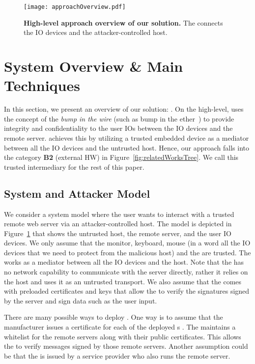 \begin{figure}[t]
\centering
\texttt{[image: approachOverview.pdf]}
\caption{\textbf{High-level approach overview of our solution.}  The \device connects the  IO devices and the attacker-controlled host. 
}
\spacesave
\label{fig:approachOverview}
\centering
\end{figure}

\section{System Overview \& Main Techniques}
\label{sec:approach}

In this section, we present an overview of our solution: \name. On the high-level, \name uses the concept of the \emph{bump in the wire} (such as bump in the ether~\cite{McCPerRei2006}) to provide integrity and confidentiality to the user IO{}s between the IO devices and the remote server. \name achieves this by utilizing a trusted embedded device as a mediator between all the IO devices and the untrusted host. Hence, our approach falls into the category \textbf{B2} (external HW) in Figure~\ref{fig:relatedWorksTree}. 
We call this trusted intermediary \device for the rest of this paper.   


\subsection{System and Attacker Model}
\label{sec:approach:systemAttackerModel}

We consider a system model where the user wants to interact with a trusted remote web server via an attacker-controlled host. The model is depicted in Figure~\ref{fig:approachOverview} that shows the untrusted host, the remote server, and the user IO devices. We only assume that the monitor, keyboard, mouse (in a word all the IO devices that we need to protect from the malicious host) and the \device are trusted. The \device works as a mediator between all the IO devices and the host. Note that the \device has no network capability to communicate with the server directly, rather it relies on the host and uses it as an untrusted transport. We also assume that the \device comes with preloaded certificates and keys that allow the \device to verify the signatures signed by the server and sign data such as the user input.

There are many possible ways to deploy \name. One way is to assume that the \device manufacturer issues a certificate for each of the deployed \device{}s . The \device maintains a whitelist for the remote servers along with their public certificates. This allows the \device to verify messages signed by those remote servers. Another assumption could be that the \device is issued by a service provider who also runs the remote server. 

